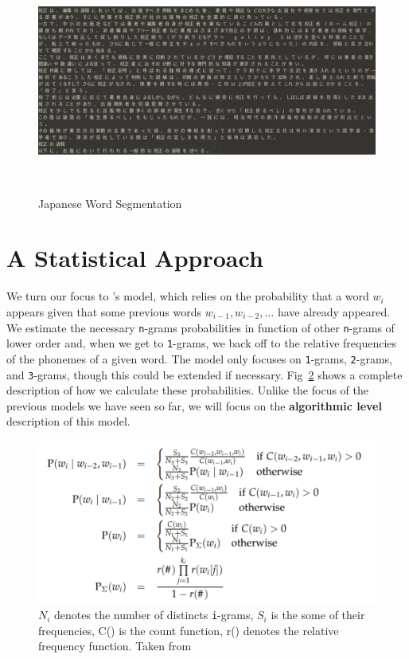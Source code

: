 \documentclass{article}
\begin{document}
\begin{figure}[h!]
  \centering
  \includegraphics[width=\columnwidth]{figures/Japanese_data.png}
  \caption{Japanese Word Segmentation}~\label{fig:figure6}
\end{figure}
\section{A Statistical Approach}

We turn our focus to \citet{Venkataraman}'s model, which relies on the probability that a word $w_i$ appears given that some previous words $w_{i-1}, w_{i-2}, \dots$ have already appeared. We estimate the necessary \texttt{n}-grams probabilities in function of other \texttt{n}-grams of lower order and, when we get to \texttt{1}-grams, we back off to the relative frequencies of the phonemes of a given word. The model only focuses on \texttt{1}-grams, \texttt{2}-grams, and \texttt{3}-grams, though this could be extended if necessary. Fig~\ref{fig:fig7} shows a complete description of how we calculate these probabilities. Unlike the focus of the previous models we have seen so far, we will focus on the \textbf{algorithmic level} description of this model.

\begin{figure}[h!]
    \centering
    \includegraphics[scale=0.8]{figures/venkataraman_1.PNG}
    \caption{$N_i$ denotes the number of distincts \texttt{i}-grams, $S_i$ is the some of their frequencies, C() is the count function, r() denotes the relative frequency function. Taken from \citet{Venkataraman}}
    \label{fig:fig7}
\end{figure}
\end{document}
